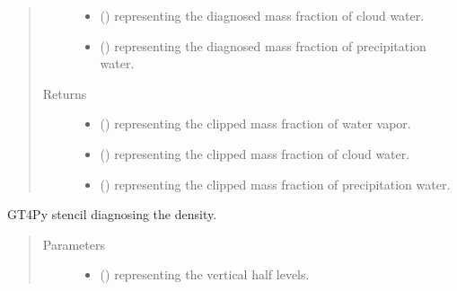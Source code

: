 \documentclass[letterpaper,10pt,english]{sphinxmanual}
\begin{document}
\begin{fulllineitems}
\begin{fulllineitems}
\begin{quote}
\begin{description}
\begin{itemize}
\item {} 
 () \textendash{}  representing the diagnosed mass fraction of cloud water.

\item {} 
 () \textendash{}  representing the diagnosed mass fraction of precipitation water.

\end{itemize}

\item[{Returns}] \leavevmode
\begin{itemize}
\item {} 
 () \textendash{}  representing the clipped mass fraction of water vapor.

\item {} 
 () \textendash{}  representing the clipped mass fraction of cloud water.

\item {} 
 () \textendash{}  representing the clipped mass fraction of precipitation water.

\end{itemize}


\end{description}\end{quote}

\end{fulllineitems}


\begin{fulllineitems}
\label{\detokenize{api:dycore.diagnostic_isentropic.DiagnosticIsentropic._stencil_diagnosing_air_density_defs}}
GT4Py stencil diagnosing the density.
\begin{quote}\begin{description}
\item[{Parameters}] \leavevmode\begin{itemize}
\item {} 
 () \textendash{}  representing the vertical half levels.


\end{itemize}
\end{description}
\end{quote}
\end{fulllineitems}
\end{fulllineitems}
\end{document}
